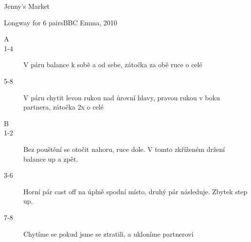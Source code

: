 
\begin{center}
    {\large Jenny's Market}
\end{center}
{\large Longway for 6 pairs\hfill BBC Emma, 2010}

\begin{description}
    \item[A]
    \item[1-4]V páru balance k sobě a od sebe, zátočka za obě ruce o celé
    \item[5-8]V páru chytit levou rukou nad ůrovní hlavy, pravou rukou v boku partnera, zátočka 2x o celé
    \item[B]
    \item[1-2]Bez pouštění se otočit nahoru, ruce dole. V tomto zkříženém držení balance up a zpět.
    \item[3-6]Horní pár cast off na úplně spodní místo, druhý pár následuje. Zbytek step up.
    \item[7-8]Chytíme se pokud jsme se ztratili, a ukloníme partnerovi
\end{description}